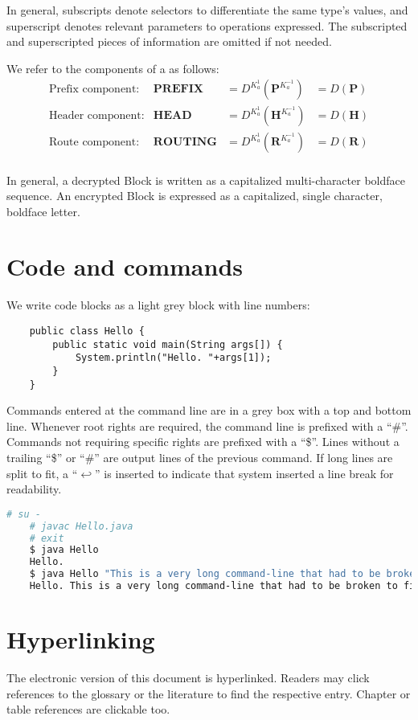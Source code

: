 In general, subscripts denote selectors to differentiate the same type's values, and superscript denotes relevant parameters to operations expressed. The subscripted and superscripted pieces of information are omitted if not needed.

We refer to the components of a \VortexMessage{} as follows:
\begin{align*}
	\text{Prefix component:}         & \mathbf{PREFIX}                 &=D^{K^{1}_a}\left(\mathbf{P}^{K^{-1}_a}\right) &=D\left(\mathbf{P}\right)\\
	\text{Header component:}         & \mathbf{HEAD}                   &=D^{K^{1}_a}\left(\mathbf{H}^{K^{-1}_a}\right) &=D\left(\mathbf{H}\right)\\
	\text{Route component:}         & \mathbf{ROUTING}                 &=D^{K^{1}_a}\left(\mathbf{R}^{K^{-1}_a}\right) &=D\left(\mathbf{R}\right)\\
\end{align*}

In general, a decrypted Block is written as a capitalized multi-character boldface sequence. An encrypted Block is expressed as a capitalized, single character, boldface letter.

\section{Code and commands}
We write code blocks as a light grey block with line numbers:

\begin{lstlisting}
	public class Hello {
		public static void main(String args[]) {
			System.println("Hello. "+args[1]);
		}
	}
\end{lstlisting}

Commands entered at the command line are in a grey box with a top and bottom line. Whenever root rights are required, the command line is prefixed with a ``\#''. Commands not requiring specific rights are prefixed with a ``\$''. Lines without a trailing ``\$'' or ``\#'' are output lines of the previous command. If long lines are split to fit, a ``$\hookleftarrow$'' is inserted to indicate that system inserted a line break for readability.

\begin{lstlisting}[language=bash]
	# su -
	# javac Hello.java 
	# exit
	$ java Hello
	Hello.
	$ java Hello "This is a very long command-line that had to be broken to fit into the code box displayed on this page."
	Hello. This is a very long command-line that had to be broken to fit into the code box displayed on this page.
\end{lstlisting}

\section{Hyperlinking}
The electronic version of this document is hyperlinked. Readers may click references to the glossary or the literature to find the respective entry. Chapter or table references are clickable too. 


